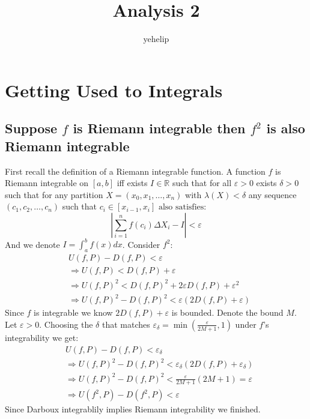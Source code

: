 \documentclass{article}
\title{\textbf{Analysis 2}}
\author{yehelip}
\date{}
\newcommand{\R}{\mathbb{R}}
\begin{document}
	\maketitle
	
	\newpage
	
	\tableofcontents
	
	\newpage
	
	\section{Getting Used to Integrals}
	\subsection{Suppose $f$ is Riemann integrable then $f^2$ is also Riemann integrable}
	First recall the definition of a Riemann integrable function. 
	A function $f$ is Riemann integrable on $[a,b]$ iff 
	exists $I\in\R$ such that for all $\varepsilon>0$ exists $\delta>0$ such that 
	for any partition $X = (x_0,x_1,\ldots,x_n)$ with $\lambda(X)<\delta$ any sequence 
	$(c_1,c_2,\ldots,c_n)$ such that $c_i\in[x_{i-1},x_i] \text{ also satisfies}:$
	\[
		\left|\sum_{i=1}^{n}{f(c_i)\Delta X_i}-I\right|<\varepsilon
	\]
	And we denote $I = \int_{a}^{b} f(x)dx$. Consider $f^2$:
	\begin{align*}
		&U(f,P) - D(f,P) < \varepsilon \\
		&\Rightarrow U(f,P) < D(f,P) + \varepsilon \\
		&\Rightarrow U(f,P)^2<D(f,P)^2 + 2\varepsilon D(f,P) + \varepsilon^2 \\
		&\Rightarrow U(f,P)^2 - D(f,P)^2 < \varepsilon (2D(f,P) + \varepsilon)
	\end{align*}	
	Since $f$ is integrable we know $2D(f,P) + \varepsilon$ is bounded.
	Denote the bound $M$.
	Let $\varepsilon > 0.$ Choosing the $\delta$ that matches $\varepsilon_{\delta} = \min(\frac{\varepsilon}{2M+1},1)$ under $f$'s integrability we get:
		\begin{align*}
		&U(f,P) - D(f,P) < \varepsilon_{\delta} \\
		&\Rightarrow U(f,P)^2 - D(f,P)^2 < \varepsilon_{\delta} (2D(f,P) + \varepsilon_{\delta})\\
		&\Rightarrow U(f,P)^2 - D(f,P)^2 <  \frac{\varepsilon}{2M+1} (2M + 1)=\varepsilon \\
		&\Rightarrow U(f^2,P) - D(f^2,P) < \varepsilon
		\end{align*}	
	Since Darboux integrablily implies Riemann integrability we finished.
\end{document}
